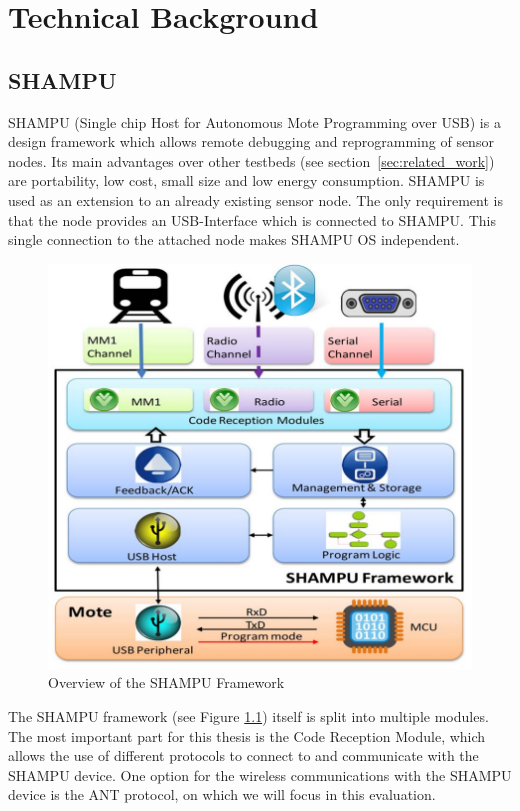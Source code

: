 \chapter{Technical Background}
\section{SHAMPU}
SHAMPU (Single chip Host for Autonomous Mote Programming over USB) \cite{Smeets:2014:DAL:2602339.2602401} is a design framework which allows remote debugging and reprogramming of sensor nodes. Its main advantages over other testbeds (see section~\ref{sec:related_work}) are portability, low cost, small size and low energy consumption. SHAMPU is used as an extension to an already existing sensor node. The only requirement is that the node provides an USB-Interface which is connected to SHAMPU. This single connection to the attached node makes SHAMPU OS independent.
\begin{figure}[H]
	\centering
	\includegraphics[scale=.5]{content/images/SHAMPUframework.png}
	\caption{Overview of the SHAMPU Framework \cite{Smeets:2014:DAL:2602339.2602401}}\label{fig:shampuframework}
\end{figure}
The SHAMPU framework (see Figure \ref{fig:shampuframework}) itself is split into multiple modules. The most important part for this thesis is the Code Reception Module, which allows the use of different protocols to connect to and communicate with the SHAMPU device. One option for the wireless communications with the SHAMPU device is the ANT protocol, on which we will focus in this evaluation.

